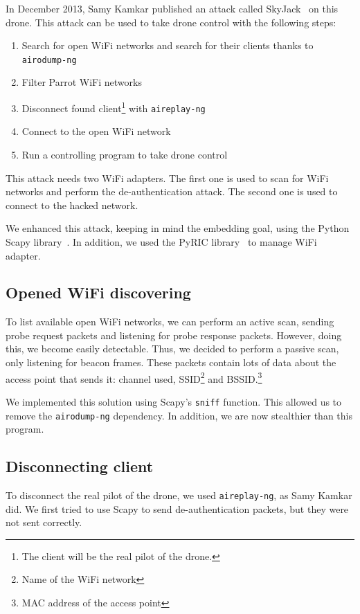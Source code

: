 \documentclass[conference,a4paper]{IEEEtran}
\newcommand{\myv}[1]{\texttt{\small#1}}
\begin{document}
In December 2013, Samy Kamkar published an attack called SkyJack~\cite{bib:skyjack} on
this drone. This attack can be used to take drone control with the following steps:

\begin{enumerate}
  \item Search for open WiFi networks and search for their clients thanks to
    \myv{airodump-ng}
  \item Filter Parrot WiFi networks
  \item Disconnect found client\footnote{The client will be the real pilot of the drone.}
    with \myv{aireplay-ng}
  \item Connect to the open WiFi network
  \item Run a controlling program to take drone control
\end{enumerate}

This attack needs two WiFi adapters. The first one is used to scan for WiFi networks and
perform the de-authentication attack. The second one is used to connect to the hacked
network.

We enhanced this attack, keeping in mind the embedding goal, using the Python Scapy
library~\cite{bib:scapy}. In addition, we used the PyRIC library~\cite{bib:pyric} to
manage WiFi adapter.

\subsection{Opened WiFi discovering}
To list available open WiFi networks, we can perform an active scan, sending probe
request packets and listening for probe response packets. However, doing this, we become
easily detectable. Thus, we decided to perform a passive scan, only listening for beacon
frames. These packets contain lots of data about the access point that sends it: channel
used, SSID\footnote{Name of the WiFi network} and BSSID.\footnote{MAC address of the access
point}

We implemented this solution using Scapy's \myv{sniff} function. This allowed us to
remove the \myv{airodump-ng} dependency. In addition, we are now stealthier than this
program.

\subsection{Disconnecting client}
To disconnect the real pilot of the drone, we used \myv{aireplay-ng}, as Samy Kamkar did.
We first tried to use Scapy to send de-authentication packets, but they were not sent
correctly.
\end{document}
